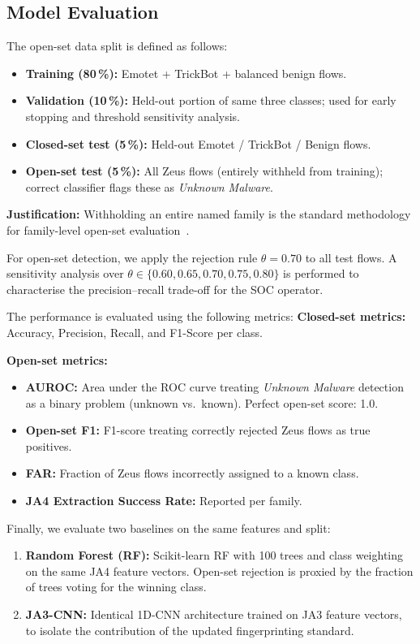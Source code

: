 \documentclass[12pt,a4paper]{report}
\begin{document}
\subsection{Model Evaluation}
The open-set data split is defined as follows:
\begin{itemize}[leftmargin=*]
  \item \textbf{Training (80\,\%):} Emotet + TrickBot + balanced benign flows.
  \item \textbf{Validation (10\,\%):} Held-out portion of same three classes; used for early stopping and threshold sensitivity analysis.
  \item \textbf{Closed-set test (5\,\%):} Held-out Emotet / TrickBot / Benign flows.
  \item \textbf{Open-set test (5\,\%):} All Zeus flows (entirely withheld from training); correct classifier flags these as \textit{Unknown Malware}.
\end{itemize}

\textbf{Justification:} Withholding an entire named family is the standard methodology for family-level open-set evaluation~\cite{opensetmalware2023}.

For open-set detection, we apply the rejection rule $\theta = 0.70$ to all test flows. A sensitivity analysis over $\theta \in \{0.60, 0.65, 0.70, 0.75, 0.80\}$ is performed to characterise the precision--recall trade-off for the SOC operator.

The performance is evaluated using the following metrics:
\textbf{Closed-set metrics:} Accuracy, Precision, Recall, and F1-Score per class.

\textbf{Open-set metrics:}
\begin{itemize}[leftmargin=*]
  \item \textbf{AUROC:} Area under the ROC curve treating \textit{Unknown Malware} detection as a binary problem (unknown vs.\ known). Perfect open-set score: 1.0.
  \item \textbf{Open-set F1:} F1-score treating correctly rejected Zeus flows as true positives.
  \item \textbf{FAR:} Fraction of Zeus flows incorrectly assigned to a known class.
  \item \textbf{JA4 Extraction Success Rate:} Reported per family.
\end{itemize}

Finally, we evaluate two baselines on the same features and split:
\begin{enumerate}[leftmargin=*, label=\arabic*.]
  \item \textbf{Random Forest (RF):} Scikit-learn RF with 100 trees and class weighting on the same JA4 feature vectors. Open-set rejection is proxied by the fraction of trees voting for the winning class.
  \item \textbf{JA3-CNN:} Identical 1D-CNN architecture trained on JA3 feature vectors, to isolate the contribution of the updated fingerprinting standard.
\end{enumerate}
\end{document}
